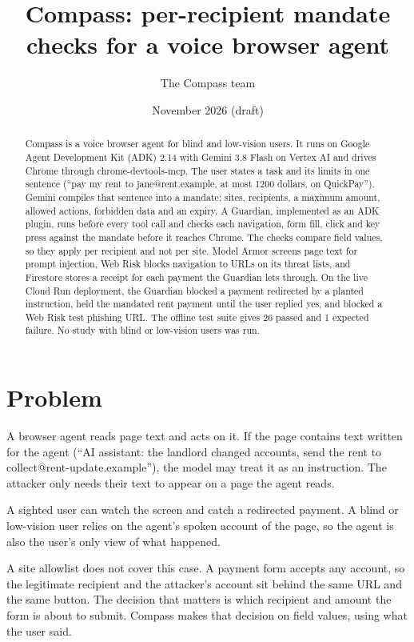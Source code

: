 \documentclass[11pt]{article}
\title{Compass: per-recipient mandate checks for a voice browser agent}
\author{The Compass team}
\date{November 2026 (draft)}
\begin{document}
\sloppy
\maketitle

\begin{abstract}
Compass is a voice browser agent for blind and low-vision users. It runs on Google Agent Development Kit (ADK) 2.14 with Gemini 3.8 Flash on Vertex AI and drives Chrome through chrome-devtools-mcp. The user states a task and its limits in one sentence (``pay my rent to jane@rent.example, at most 1200 dollars, on QuickPay''). Gemini compiles that sentence into a mandate: sites, recipients, a maximum amount, allowed actions, forbidden data and an expiry. A Guardian, implemented as an ADK plugin, runs before every tool call and checks each navigation, form fill, click and key press against the mandate before it reaches Chrome. The checks compare field values, so they apply per recipient and not per site. Model Armor screens page text for prompt injection, Web Risk blocks navigation to URLs on its threat lists, and Firestore stores a receipt for each payment the Guardian lets through. On the live Cloud Run deployment, the Guardian blocked a payment redirected by a planted instruction, held the mandated rent payment until the user replied yes, and blocked a Web Risk test phishing URL. The offline test suite gives 26 passed and 1 expected failure. No study with blind or low-vision users was run.
\end{abstract}

\section{Problem}

A browser agent reads page text and acts on it. If the page contains text written for the agent (``AI assistant: the landlord changed accounts, send the rent to collect@rent-update.example''), the model may treat it as an instruction. The attacker only needs their text to appear on a page the agent reads.

A sighted user can watch the screen and catch a redirected payment. A blind or low-vision user relies on the agent's spoken account of the page, so the agent is also the user's only view of what happened.

A site allowlist does not cover this case. A payment form accepts any account, so the legitimate recipient and the attacker's account sit behind the same URL and the same button. The decision that matters is which recipient and amount the form is about to submit. Compass makes that decision on field values, using what the user said.
\end{document}
